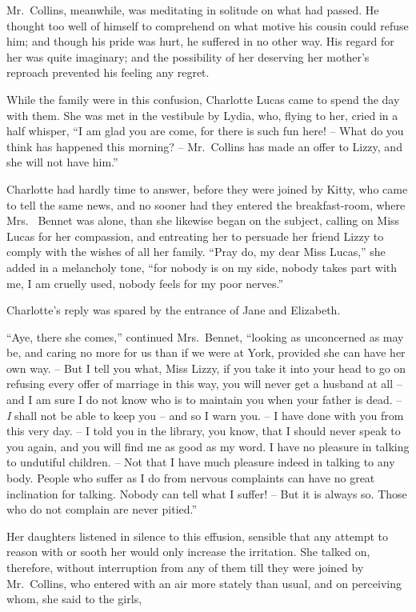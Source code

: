 Mr.\ Collins, meanwhile, was meditating in solitude on
what had passed. He thought too well of himself to comprehend
on what motive his cousin could refuse him; and
though his pride was hurt, he suffered in no other way.
His regard for her was quite imaginary; and the possibility
of her deserving her mother’s reproach prevented his
feeling any regret.

While the family were in this confusion, Charlotte
Lucas came to spend the day with them. She was met
in the vestibule by Lydia, who, flying to her, cried in a
half whisper, “I am glad you are come, for there is such
fun here! -- What do you think has happened this
morning? -- Mr.\ Collins has made an offer to Lizzy, and she will
not have him.”

Charlotte had hardly time to answer, before they were
joined by Kitty, who came to tell the same news, and no
sooner had they entered the breakfast-room, where Mrs.\ %
Bennet was alone, than she likewise began on the subject,
calling on Miss Lucas for her compassion, and entreating
her to persuade her friend Lizzy to comply with the wishes
of all her family. “Pray do, my dear Miss Lucas,” she
added in a melancholy tone, “for nobody is on my side,
nobody takes part with me, I am cruelly used, nobody
feels for my poor nerves.”

Charlotte’s reply was spared by the entrance of Jane
and Elizabeth.

“Aye, there she comes,” continued Mrs.\ Bennet,
“looking as unconcerned as may be, and caring no more
for us than if we were at York, provided she can have
her own way. -- But I tell you what, Miss Lizzy, if you
take it into your head to go on refusing every offer of
marriage in this way, you will never get a husband at
all -- and I am sure I do not know who is to maintain you
when your father is dead. -- \textit{I} shall not be able to keep
you -- and so I warn you. -- I have done with you from
this very day. -- I told you in the library, you know, that
I should never speak to you again, and you will find me
as good as my word. I have no pleasure in talking to
undutiful children. -- Not that I have much pleasure indeed
in talking to any body. People who suffer as I do from
nervous complaints can have no great inclination for
talking. Nobody can tell what I suffer! -- But it is always
so. Those who do not complain are never pitied.”

Her daughters listened in silence to this effusion, sensible
that any attempt to reason with or sooth her would only
increase the irritation. She talked on, therefore, without
interruption from any of them till they were joined by
Mr.\ Collins, who entered with an air more stately than
usual, and on perceiving whom, she said to the girls,

